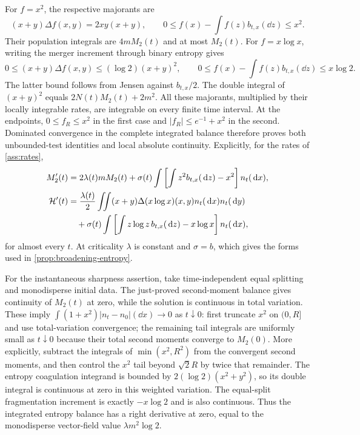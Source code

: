 For $f=x^2$, the respective majorants are
\[
 (x+y)\Delta f(x,y)=2xy(x+y),\qquad
 0\leq f(x)-\int f(z)b_{t,x}(\dd z)\leq x^2.
\]
Their population integrals are $4mM_2(t)$ and at most $M_2(t)$.
For $f=x\log x$, writing the merger increment through binary entropy gives
\[
 0\leq(x+y)\Delta f(x,y)\leq(\log2)(x+y)^2,
 \qquad
 0\leq f(x)-\int f(z)b_{t,x}(\dd z)\leq x\log2.
\]
The latter bound follows from Jensen against $b_{t,x}/2$.
The double integral of $(x+y)^2$ equals $2N(t)M_2(t)+2m^2$.
All these majorants, multiplied by their locally integrable rates, are
integrable on every finite time interval. At the endpoints,
$0\leq f_R\leq x^2$ in the first case and
$|f_R|\leq e^{-1}+x^2$ in the second. Dominated convergence in the complete
integrated balance therefore proves both unbounded-test identities and
local absolute continuity. Explicitly, for the rates of
\cref{ass:rates},
\begin{align}
 M_2'(t)&=2\lambda(t)mM_2(t)
 +\sigma(t)\int\left[\int z^2b_{t,x}(\,\mathrm d z)-x^2\right]n_t(\,\mathrm d x),
 \label{eq:full-second-balance}\\
 \mathcal H'(t)&=\frac{\lambda(t)}2\iint(x+y)\Delta(x\log x)(x,y)
                         n_t(\,\mathrm d x)n_t(\,\mathrm d y)\notag\\
 &\quad+\sigma(t)\int\left[\int z\log z\,b_{t,x}(\,\mathrm d z)-x\log x\right]
                         n_t(\,\mathrm d x),\label{eq:full-entropy-balance}
\end{align}
for almost every $t$. At criticality $\lambda$ is constant and
$\sigma=b$, which gives the forms used in \cref{prop:broadening-entropy}.

For the instantaneous sharpness assertion, take time-independent equal
splitting and monodisperse initial data. The just-proved second-moment
balance gives continuity of $M_2(t)$ at zero, while the solution is continuous
in total variation. These imply
$\int(1+x^2)|n_t-n_0|(\dd x)\to0$ as $t\downarrow0$: first truncate $x^2$
on $(0,R]$ and use total-variation convergence; the remaining tail integrals
are uniformly small as $t\downarrow0$ because their total second moments
converge to $M_2(0)$. More explicitly, subtract the integrals of
$\min(x^2,R^2)$ from the convergent second moments, and then control the
$x^2$ tail beyond $\sqrt2R$ by twice that remainder.
The entropy coagulation integrand is bounded by
$2(\log2)(x^2+y^2)$, so its double integral is continuous at zero in this
weighted variation. The equal-split fragmentation increment is exactly
$-x\log2$ and is also continuous. Thus the integrated entropy balance has
a right derivative at zero, equal to the monodisperse vector-field value
$\lambda m^2\log2$.

